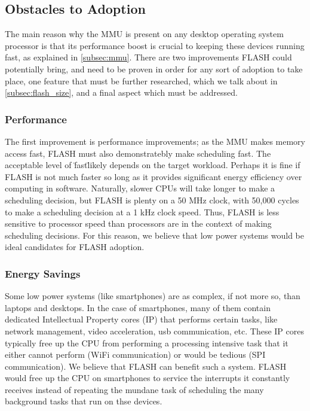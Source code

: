 \documentclass{sig-alternate-10pt}
\begin{document}
\subsection{Obstacles to Adoption}
The main reason why the MMU is present on any desktop operating system processor is that its performance boost is crucial to keeping these devices running fast, as explained in \ref{subsec:mmu}. There are two improvements FLASH could potentially bring, and need to be proven in order for any sort of adoption to take place, one feature that must be further researched, which we talk about in \ref{subsec:flash_size}, and a final aspect which must be addressed.

\subsubsection{Performance}
The first improvement is performance improvements; as the MMU makes memory access fast, FLASH must also demonstratebly make scheduling fast. The acceptable level of \"fast\" likely depends on the target workload. Perhaps it is fine if FLASH is not much faster so long as it provides significant energy efficiency over computing in software. Naturally, slower CPUs will take longer to make a scheduling decision, but FLASH is plenty on a 50 MHz clock, with 50,000 cycles to make a scheduling decision at a 1 kHz clock speed. Thus, FLASH is less sensitive to processor speed than processors are in the context of making scheduling decisions. For this reason, we believe that low power systems would be ideal candidates for FLASH adoption.

\subsubsection{Energy Savings}
Some low power systems (like smartphones) are as complex, if not more so, than laptops and desktops. In the case of smartphones, many of them contain dedicated Intellectual Property cores (IP) that performs certain tasks, like network management, video acceleration, usb communication, etc. These IP cores typically free up the CPU from performing a processing intensive task that it either cannot perform (WiFi communication) or would be tedious (SPI communication). We believe that FLASH can benefit such a system. FLASH would free up the CPU on smartphones to service the interrupts it constantly receives instead of repeating the mundane task of scheduling the many background tasks that run on thse devices.
\end{document}
